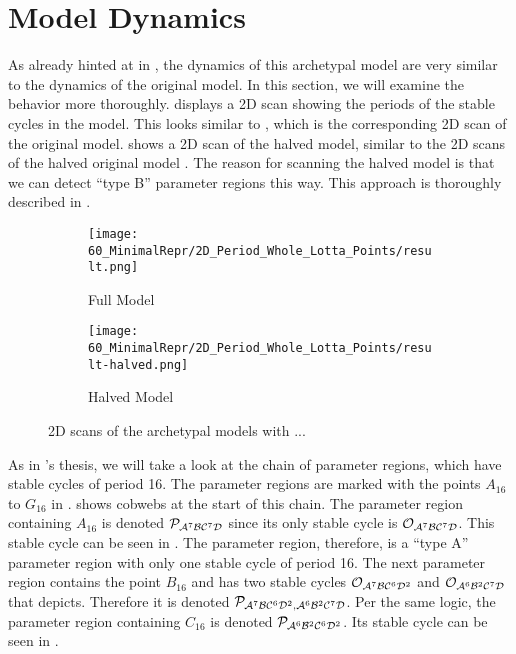 \section{Model Dynamics}
\label{sec:dynarch.dynamics}

As already hinted at in , the dynamics of this archetypal model are very similar to the dynamics of the original model.
In this section, we will examine the behavior more thoroughly.
 displays a 2D scan showing the periods of the stable cycles in the model.
This looks similar to , which is the corresponding 2D scan of the original model.
 shows a 2D scan of the halved model, similar to the 2D scans of the halved original model .
The reason for scanning the halved model is that we can detect ``type B'' parameter regions this way.
This approach is thoroughly described in .

\begin{figure}
	\centering
	\begin{subfigure}{0.4\textwidth}
		\centering
		\texttt{[image: 60\_MinimalRepr/2D\_Period\_Whole\_Lotta\_Points/result.png]}
		\caption{Full Model}
		\label{fig:final.period.whole.full}
	\end{subfigure}
	\begin{subfigure}{0.4\textwidth}
		\centering
		\texttt{[image: 60\_MinimalRepr/2D\_Period\_Whole\_Lotta\_Points/result-halved.png]}
		\caption{Halved Model}
		\label{fig:final.period.whole.halved}
	\end{subfigure}
	\caption[2D scans of the archetypal model]{
		2D scans of the archetypal models with ...
	}
\end{figure}

As in 's thesis, we will take a look at the chain of parameter regions, which have stable cycles of period 16.
The parameter regions are marked with the points $A_{16}$ to $G_{16}$ in .
 shows cobwebs at the start of this chain.
The parameter region containing $A_{16}$ is denoted $\mathcal{P}_{\mathcal{A}^7\mathcal{B}\mathcal{C}^7\mathcal{D}}$ since its only stable cycle is $\mathcal{O}_{\mathcal{A}^7\mathcal{B}\mathcal{C}^7\mathcal{D}}$.
This stable cycle can be seen in .
The parameter region, therefore, is a ``type A'' parameter region with only one stable cycle of period 16.
The next parameter region contains the point $B_{16}$ and has two stable cycles $\mathcal{O}_{\mathcal{A}^7\mathcal{B}\mathcal{C}^6\mathcal{D}^2}$ and $\mathcal{O}_{\mathcal{A}^6\mathcal{B}^2\mathcal{C}^7\mathcal{D}}$ that  depicts.
Therefore it is denoted $\mathcal{P}_{\mathcal{A}^7\mathcal{B}\mathcal{C}^6\mathcal{D}^2, \mathcal{A}^6\mathcal{B}^2\mathcal{C}^7\mathcal{D}}$.
Per the same logic, the parameter region containing $C_{16}$ is denoted $\mathcal{P}_{\mathcal{A}^6\mathcal{B}^2\mathcal{C}^6\mathcal{D}^2}$.
Its stable cycle can be seen in .


